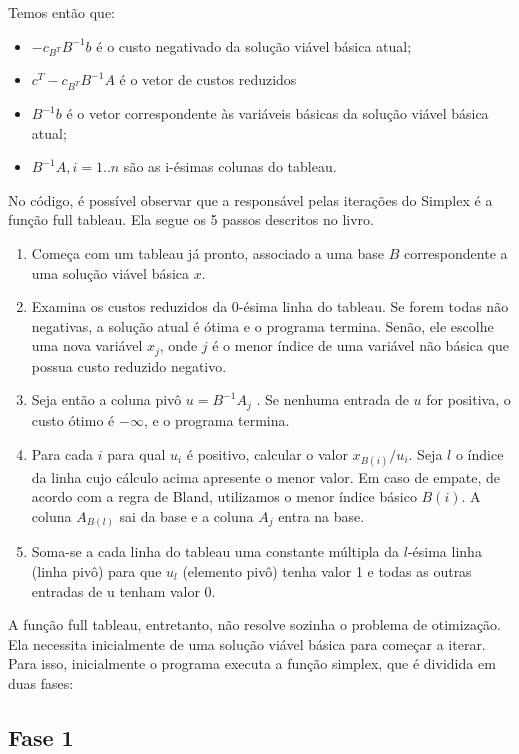 \documentclass[brazil,times]{abnt}
\begin{document}
Temos então que:

\begin{itemize}
	\item[] $-c_{B^T}B^{-1}b$ é o custo negativado da solução viável básica atual;
	\item[] $c^T - c_{B^T}B^{-1}A$ é o vetor de custos reduzidos
	\item[] $B^{-1}b$ é o vetor correspondente às variáveis básicas da solução viável básica atual;
	\item[] $B^{-1}A, i = 1..n$  são as i-ésimas colunas do tableau.
\end{itemize}

No código, é possível observar que a responsável pelas iterações do Simplex é a função full tableau. Ela segue os 5 passos descritos no livro.

\begin{enumerate}
	\item Começa com um tableau já pronto, associado a uma base $B$ correspondente a uma solução viável básica $x$.
	\item Examina os custos reduzidos da 0-ésima linha do tableau. Se forem todas não negativas, a solução atual é ótima e o programa termina. Senão, ele escolhe uma nova variável $x_j$, onde $j$ é o menor índice de uma variável não básica que possua custo reduzido negativo.
	\item Seja então a coluna pivô $u = B^{-1}A_j$ . Se nenhuma entrada de $u$ for positiva, o custo ótimo é $-\infty$, e o programa termina.
	\item Para cada $i$ para qual $u_i$ é positivo, calcular o valor $x_{B(i)}/u_i$. Seja $l$ o índice da linha cujo cálculo acima apresente o menor valor. Em caso de empate, de acordo com a regra de Bland, utilizamos o menor índice básico $B(i)$. A coluna $A_{B(l)}$ sai da base e a coluna $A_j$ entra na base.
	\item Soma-se a cada linha do tableau uma constante múltipla da $l$-ésima linha (linha pivô) para que $u_l$ (elemento pivô) tenha valor 1 e todas as outras entradas de u tenham valor 0.
\end{enumerate}

A função full tableau, entretanto, não resolve sozinha o problema de otimização. Ela necessita inicialmente de uma solução viável básica para começar a iterar. Para isso, inicialmente o programa executa a função simplex, que é dividida em duas fases:

\subsection*{Fase 1}
\end{document}

